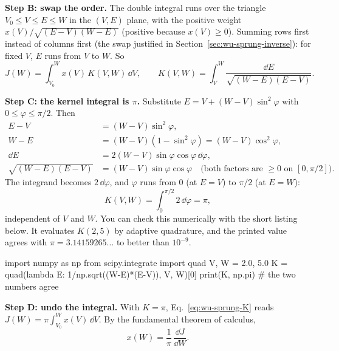 \textbf{Step B: swap the order.} The double integral runs over the triangle $V_0\le V\le E\le W$ in the $(V,E)$ plane, with the positive weight $x(V)/\sqrt{(E-V)(W-E)}$ (positive because $x(V)\ge0$). Summing rows first instead of columns first (the swap justified in Section~\ref{sec:wu-sprung-inverse}): for fixed $V$, $E$ runs from $V$ to $W$. So
\begin{equation}
J(W)=\int_{V_0}^{W}x(V)\,K(V,W)\,\dd V,\qquad K(V,W)=\int_{V}^{W}\frac{\dd E}{\sqrt{(W-E)(E-V)}} .
\label{eq:wu-sprung-K}
\end{equation}

\textbf{Step C: the kernel integral is $\pi$.} Substitute $E=V+(W-V)\sin^2\varphi$ with $0\le\varphi\le\pi/2$. Then
\begin{align*}
E-V&=(W-V)\sin^2\varphi,\\
W-E&=(W-V)(1-\sin^2\varphi)=(W-V)\cos^2\varphi,\\
\dd E&=2(W-V)\sin\varphi\cos\varphi\,\dd\varphi,\\
\sqrt{(W-E)(E-V)}&=(W-V)\sin\varphi\cos\varphi\quad\text{(both factors are }\ge0\text{ on }[0,\pi/2]).
\end{align*}
The integrand becomes $2\,\dd\varphi$, and $\varphi$ runs from $0$ (at $E=V$) to $\pi/2$ (at $E=W$):
\begin{equation}
K(V,W)=\int_0^{\pi/2}2\,\dd\varphi=\pi,
\label{eq:wu-sprung-Kpi}
\end{equation}
independent of $V$ and $W$. You can check this numerically with the short listing below. It evaluates $K(2,5)$ by adaptive quadrature, and the printed value agrees with $\pi=3.14159265\ldots$ to better than $10^{-9}$.
\begin{pycode}
import numpy as np
from scipy.integrate import quad
V, W = 2.0, 5.0
K = quad(lambda E: 1/np.sqrt((W-E)*(E-V)), V, W)[0]
print(K, np.pi)     # the two numbers agree
\end{pycode}

\textbf{Step D: undo the integral.} With $K=\pi$, Eq.~\eqref{eq:wu-sprung-K} reads $J(W)=\pi\int_{V_0}^{W}x(V)\,\dd V$. By the fundamental theorem of calculus,
\begin{equation}
x(W)=\frac1\pi\,\frac{\dd J}{\dd W}.
\label{eq:wu-sprung-xJ}
\end{equation}


